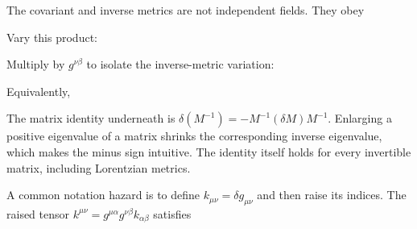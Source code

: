 \documentclass[
  11pt,
  letterpaper,
  oneside,
  openany]{scrbook}
\begin{document}
The covariant and inverse metrics are not independent fields. They obey

\begin{center}
\begingroup
{}
\ifdim\wd\grmathbox>\linewidth
\resizebox{\linewidth}{!}{\usebox{\grmathbox}}
\else\usebox{\grmathbox}\fi
\endgroup
\end{center}

Vary this product:

\begin{center}
\begingroup
{}
\ifdim\wd\grmathbox>\linewidth
\resizebox{\linewidth}{!}{\usebox{\grmathbox}}
\else\usebox{\grmathbox}\fi
\endgroup
\end{center}

Multiply by \(g^{\nu\beta}\) to isolate the inverse-metric variation:

\begin{center}
\begingroup
{}
\ifdim\wd\grmathbox>\linewidth
\resizebox{\linewidth}{!}{\usebox{\grmathbox}}
\else\usebox{\grmathbox}\fi
\endgroup
\end{center}

Equivalently,

\begin{center}
\begingroup
{}
\ifdim\wd\grmathbox>\linewidth
\resizebox{\linewidth}{!}{\usebox{\grmathbox}}
\else\usebox{\grmathbox}\fi
\endgroup
\end{center}

The matrix identity underneath is
\(\delta(M^{-1})=-M^{-1}(\delta M)M^{-1}\). Enlarging a positive
eigenvalue of a matrix shrinks the corresponding inverse eigenvalue,
which makes the minus sign intuitive. The identity itself holds for
every invertible matrix, including Lorentzian metrics.

A common notation hazard is to define \(k_{\mu\nu}=\delta g_{\mu\nu}\)
and then raise its indices. The raised tensor
\(k^{\mu\nu}=g^{\mu\alpha}g^{\nu\beta}k_{\alpha\beta}\) satisfies
\end{document}
